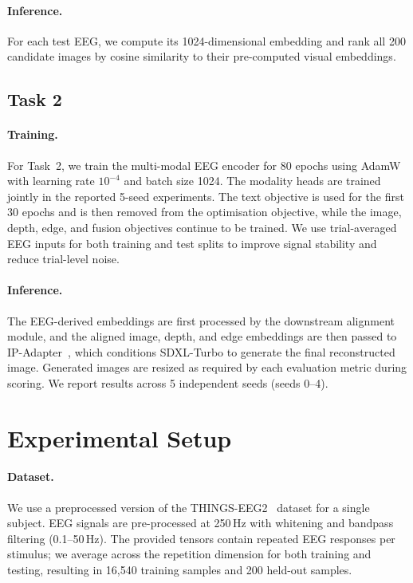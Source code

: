 \documentclass[11pt]{article}
\begin{document}
\paragraph{Inference.}
For each test EEG, we compute its 1024-dimensional embedding and rank all 200 candidate images by cosine similarity to their pre-computed visual embeddings.

\subsection{Task 2}

\paragraph{Training.}
For Task~2, we train the multi-modal EEG encoder for 80 epochs using AdamW with learning rate $10^{-4}$ and batch size 1024.
The modality heads are trained jointly in the reported 5-seed experiments.
The text objective is used for the first 30 epochs and is then removed from the optimisation objective, while the image, depth, edge, and fusion objectives continue to be trained.
We use trial-averaged EEG inputs for both training and test splits to improve signal stability and reduce trial-level noise.

\paragraph{Inference.}
The EEG-derived embeddings are first processed by the downstream alignment module, and the aligned image, depth, and edge embeddings are then passed to IP-Adapter~\citep{ye2023ipadapter}, which conditions SDXL-Turbo to generate the final reconstructed image.
Generated images are resized as required by each evaluation metric during scoring.
We report results across 5 independent seeds (seeds 0--4).

\section{Experimental Setup}

\paragraph{Dataset.}
We use a preprocessed version of the THINGS-EEG2~\citep{gifford2022thingseeg2data} dataset for a single subject.
EEG signals are pre-processed at 250\,Hz with whitening and bandpass filtering (0.1--50\,Hz).
The provided tensors contain repeated EEG responses per stimulus; we average across the repetition dimension for both training and testing, resulting in 16,540 training samples and 200 held-out samples.
\end{document}
